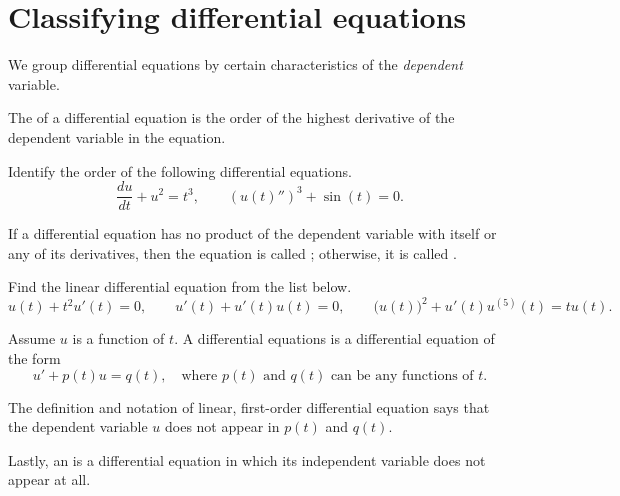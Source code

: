 \documentclass[../main.tex]{subfiles}
\begin{document}
 \section{Classifying differential equations}

We group differential equations by certain characteristics of the \emph{dependent} variable.

\begin{definition}[order]
The  of a differential equation is the order of the highest derivative of the dependent variable in the equation.
\end{definition}
\begin{example}
  Identify the order of the following differential equations.
  \[
    \frac{du}{dt} + u^{2} = t^{3}, 
    \qquad
    \left(u(t)''\right)^{3} + \sin(t) = 0.
  \]
\end{example}

\begin{definition}
  If a differential equation has no product of the dependent variable with itself or any of its derivatives, then the equation is called ; otherwise, it is called . 
\end{definition}
\begin{example}
  Find the linear differential equation from the list below.
  \[
    u(t) + t^{2} u'(t) = 0,
    \qquad
    u'(t) + u'(t) u(t) = 0,
    \qquad
    \big(u(t)\big)^{2} + u'(t) u^{(5)}(t) = t u(t).
  \]
\end{example}

\begin{definition}
  Assume \(u\) is a function of \(t\). A  differential equations is a differential equation of the form
  \[
    u' + p(t) u = q(t), \quad\text{where \(p(t)\) and \(q(t)\) can be any functions of \(t\)}.
  \]
\end{definition}

\faExclamationTriangle{} The definition and notation of linear, first-order differential equation says that the dependent variable \(u\) does not appear in \(p(t)\) and \(q(t)\).

Lastly, an  is a differential equation in which its independent variable does not appear at all. 
\end{document}
